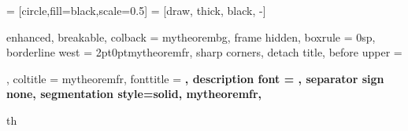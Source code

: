 \else

	\fancyhead[LO]{\textbf{\rightmark}} %
	\fancyhead[RO]{\thepage} %

\fi
\makeatother %





\newcommand\mycommfont[1]{\footnotesize\ttfamily\textcolor{blue}{#1}}
\newcommand{\incfig}[1]{%
	\def\svgwidth{\columnwidth}
	{#1.pdf_tex}
}

\usepackage{tikzsymbols}
 = [circle,fill=black,scale=0.5]
 = [draw, thick, black, -]
\renewcommand\qedsymbol{$\Laughey$} %







\setlength{\parindent}{1cm}

{%
	enhanced,
	breakable,
	colback = mytheorembg,
	frame hidden,
	boxrule = 0sp,
	borderline west = {2pt}{0pt}{mytheoremfr},
	sharp corners,
	detach title,
	before upper = \tcbtitle\par\smallskip,
	coltitle = mytheoremfr,
	fonttitle = \bfseries\sffamily,
	description font = \mdseries,
	separator sign none,
	segmentation style={solid, mytheoremfr},
}
{th}

